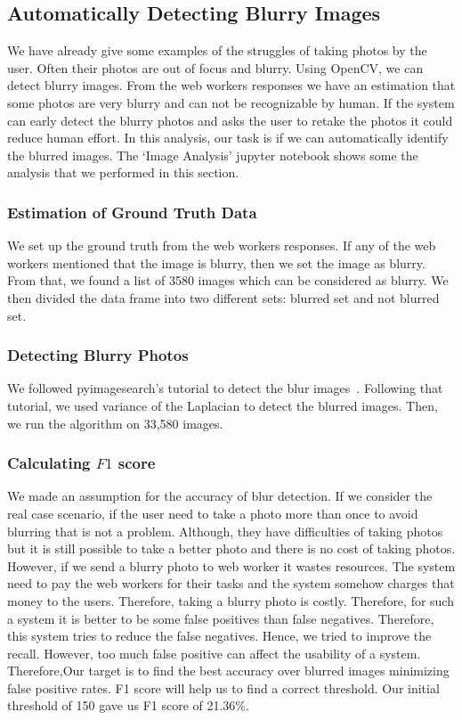 \documentclass[sigconf]{acmart}
\begin{document}
\subsection{Automatically Detecting Blurry Images}
We have already give some examples of the struggles of taking photos by the user. Often their photos are out of focus and blurry. Using OpenCV, we can detect blurry images. From the web workers responses we have an estimation that some photos are very blurry and can not be recognizable by human. If the system can early detect the blurry photos and asks the user to retake the photos it could reduce human effort. In this analysis, our task is if we can automatically identify the blurred images. The `Image Analysis' jupyter notebook shows some the analysis that we performed in this section.

\subsubsection{Estimation of Ground Truth Data}
 We set up the ground truth from the web workers responses. If any of the web workers mentioned that the image is blurry, then we set the image as blurry. From that, we found a list of 3580 images which can be considered as blurry. We then divided the data frame into two different sets: blurred set and not blurred set. 

\subsubsection{Detecting Blurry Photos} We followed pyimagesearch's tutorial to detect the blur images~\cite{blur}. Following that tutorial, we used variance of the Laplacian to detect the blurred images. Then, we run  the algorithm on 33,580 images. 

\subsubsection{Calculating $F1$ score} We made an assumption for the accuracy of blur detection. If we consider the real case scenario, if the user need to take a photo more than once to avoid blurring that is not a problem. Although, they have difficulties of taking photos but it is still possible to take a better photo and there is no cost of taking photos. However, if we send a blurry photo to web worker it wastes resources. The system need to pay the web workers for their tasks and the system somehow charges that money to the users. Therefore, taking a blurry photo is costly. Therefore, for such a system it is better to be some false positives than false negatives. Therefore, this system tries to reduce the false negatives. Hence, we tried to improve the recall. However, too much false positive can affect the usability of a system. Therefore,Our target is to find the best accuracy over blurred images minimizing false positive rates. F1 score will help us to find a correct threshold. Our initial threshold of 150 gave us F1 score of 21.36\%.
\end{document}
